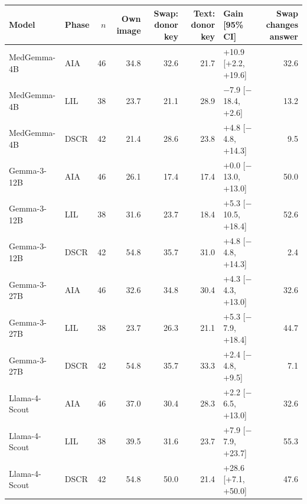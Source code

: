 \begin{tabular}{llrrrrlr}
\toprule
Model & Phase & $n$ & Own image & Swap: donor key & Text: donor key & Gain [95\% CI] & Swap changes answer \\
\midrule
MedGemma-4B & AIA & 46 & 34.8 & 32.6 & 21.7 & +10.9 [+2.2, +19.6] & 32.6 \\
MedGemma-4B & LIL & 38 & 23.7 & 21.1 & 28.9 & $-$7.9 [$-$18.4, +2.6] & 13.2 \\
MedGemma-4B & DSCR & 42 & 21.4 & 28.6 & 23.8 & +4.8 [$-$4.8, +14.3] & 9.5 \\
Gemma-3-12B & AIA & 46 & 26.1 & 17.4 & 17.4 & +0.0 [$-$13.0, +13.0] & 50.0 \\
Gemma-3-12B & LIL & 38 & 31.6 & 23.7 & 18.4 & +5.3 [$-$10.5, +18.4] & 52.6 \\
Gemma-3-12B & DSCR & 42 & 54.8 & 35.7 & 31.0 & +4.8 [$-$4.8, +14.3] & 2.4 \\
Gemma-3-27B & AIA & 46 & 32.6 & 34.8 & 30.4 & +4.3 [$-$4.3, +13.0] & 32.6 \\
Gemma-3-27B & LIL & 38 & 23.7 & 26.3 & 21.1 & +5.3 [$-$7.9, +18.4] & 44.7 \\
Gemma-3-27B & DSCR & 42 & 54.8 & 35.7 & 33.3 & +2.4 [$-$4.8, +9.5] & 7.1 \\
Llama-4-Scout & AIA & 46 & 37.0 & 30.4 & 28.3 & +2.2 [$-$6.5, +13.0] & 32.6 \\
Llama-4-Scout & LIL & 38 & 39.5 & 31.6 & 23.7 & +7.9 [$-$7.9, +23.7] & 55.3 \\
Llama-4-Scout & DSCR & 42 & 54.8 & 50.0 & 21.4 & +28.6 [+7.1, +50.0] & 47.6 \\
\bottomrule
\end{tabular}
